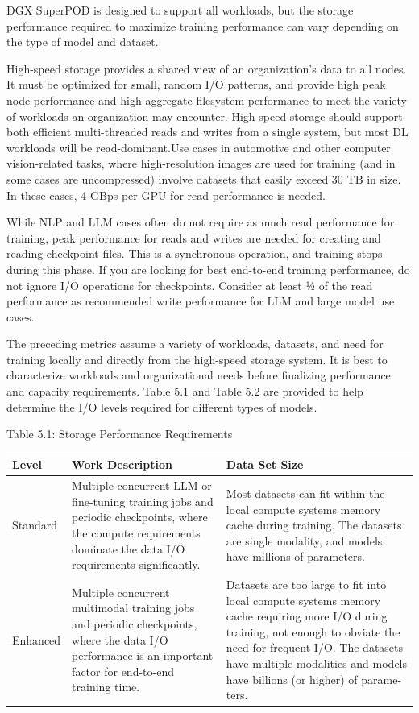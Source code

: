 \documentclass[
  10
]{article}
\newcounter{none} %
\begin{document}
DGX SuperPOD is designed to support all workloads, but the storage
performance required to maximize training performance can vary depending
on the type of model and dataset.

High-speed storage provides a shared view of an organization's data to
all nodes. It must be optimized for small, random I/O patterns, and
provide high peak node performance and high aggregate filesystem
performance to meet the variety of workloads an organization may
encounter. High-speed storage should support both efficient
multi-threaded reads and writes from a single system, but most DL
workloads will be read-dominant.Use cases in automotive and other
computer vision-related tasks, where high-resolution images are used for
training (and in some cases are uncompressed) involve datasets that
easily exceed 30 TB in size. In these cases, 4 GBps per GPU for read
performance is needed.

While NLP and LLM cases often do not require as much read performance
for training, peak performance for reads and writes are needed for
creating and reading checkpoint files. This is a synchronous operation,
and training stops during this phase. If you are looking for best
end-to-end training performance, do not ignore I/O operations for
checkpoints. Consider at least ½ of the read performance as recommended
write performance for LLM and large model use cases.

The preceding metrics assume a variety of workloads, datasets, and need
for training locally and directly from the high-speed storage system. It
is best to characterize workloads and organizational needs before
finalizing performance and capacity requirements. Table 5.1 and Table
5.2 are provided to help determine the I/O levels required for different
types of models.

Table 5.1: Storage Performance Requirements

{\def\LTcaptype{none} %
\begin{longtable}[]{@{}|l|l|l|@{}}
\toprule\noalign{}
\endhead
\bottomrule\noalign{}
\endlastfoot
\hline
Level & Work Description & Data Set Size \\
\hline
Standard & Multiple concurrent LLM or fine-tuning training jobs and
periodic checkpoints, where the compute requirements dominate the data
I/O requirements significantly. & Most datasets can fit within the local
compute systems\textquotesingle{} memory cache during training. The
datasets are single modality, and models have millions of parameters. \\
\hline
Enhanced & Multiple concurrent multimodal training jobs and periodic
checkpoints, where the data I/O performance is an important factor for
end-to-end training time. & Datasets are too large to fit into local
compute systems\textquotesingle{} memory cache requiring more I/O during
training, not enough to obviate the need for frequent I/O. The datasets
have multiple modalities and models have billions (or higher) of
parame-ters. \\
\hline
\end{longtable}
}
\end{document}
